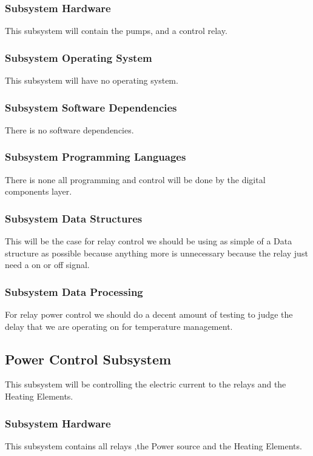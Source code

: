\subsubsection{Subsystem Hardware}
This subsystem will contain the pumps, and a control relay.

\subsubsection{Subsystem Operating System}
This subsystem will have no operating system.

\subsubsection{Subsystem Software Dependencies}
There is no software dependencies.

\subsubsection{Subsystem Programming Languages}
There is none all programming and control will be done by the digital components layer.

\subsubsection{Subsystem Data Structures}
This will be the case for relay control we should be using as simple of a Data structure as possible because anything more is unnecessary because the relay just need a on or off signal. 

\subsubsection{Subsystem Data Processing}
For relay power control we should do a decent amount of testing to judge the delay that we are operating on for temperature management.



\subsection{Power Control Subsystem}
This subsystem will be controlling the electric current to the relays and the Heating Elements.


\subsubsection{Subsystem Hardware}
This subsystem contains all relays ,the Power source and the Heating Elements.



